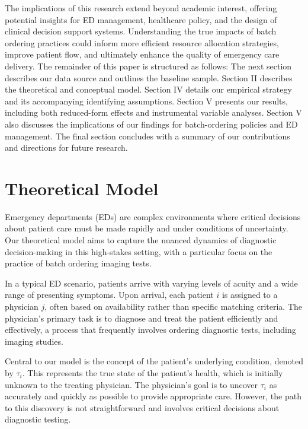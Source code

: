 \documentclass[,,nonblindrev]{informs}
\begin{document}
The implications of this research extend beyond academic interest,
offering potential insights for ED management, healthcare policy, and
the design of clinical decision support systems. Understanding the true
impacts of batch ordering practices could inform more efficient resource
allocation strategies, improve patient flow, and ultimately enhance the
quality of emergency care delivery. The remainder of this paper is
structured as follows: The next section describes our data source and
outlines the baseline sample. Section II describes the theoretical and
conceptual model. Section IV details our empirical strategy and its
accompanying identifying assumptions. Section V presents our results,
including both reduced-form effects and instrumental variable analyses.
Section V also discusses the implications of our findings for
batch-ordering policies and ED management. The final section concludes
with a summary of our contributions and directions for future research.

\hypertarget{theoretical-model}{%
\section{Theoretical Model}\label{theoretical-model}}

Emergency departments (EDs) are complex environments where critical
decisions about patient care must be made rapidly and under conditions
of uncertainty. Our theoretical model aims to capture the nuanced
dynamics of diagnostic decision-making in this high-stakes setting, with
a particular focus on the practice of batch ordering imaging tests.

In a typical ED scenario, patients arrive with varying levels of acuity
and a wide range of presenting symptoms. Upon arrival, each patient
\(i\) is assigned to a physician \(j\), often based on availability
rather than specific matching criteria. The physician's primary task is
to diagnose and treat the patient efficiently and effectively, a process
that frequently involves ordering diagnostic tests, including imaging
studies.

Central to our model is the concept of the patient's underlying
condition, denoted by \(\tau_i\). This represents the true state of the
patient's health, which is initially unknown to the treating physician.
The physician's goal is to uncover \(\tau_i\) as accurately and quickly
as possible to provide appropriate care. However, the path to this
discovery is not straightforward and involves critical decisions about
diagnostic testing.
\end{document}
